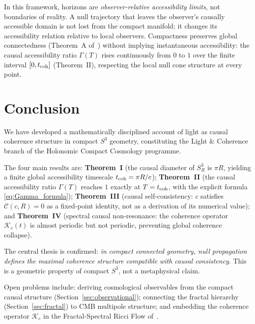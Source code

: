 \documentclass[12pt,a4paper]{article}
\theoremstyle{plain}
\theoremstyle{definition}
\theoremstyle{remark}
\begin{document}
In this framework, horizons are \emph{observer-relative accessibility limits},
not boundaries of reality.
A null trajectory that leaves the observer's causally accessible domain is not
lost from the compact manifold; it changes its accessibility relation relative
to local observers.
Compactness preserves global connectedness (Theorem~A of~\cite{HCC25}) without
implying instantaneous accessibility: the causal accessibility ratio $\Gamma(T)$
rises continuously from $0$ to $1$ over the finite interval $[0, t_{\rm coh}]$
(Theorem~II), respecting the local null cone structure at every point.

\section*{Conclusion}

We have developed a mathematically disciplined account of light as causal
coherence structure in compact $S^3$ geometry, constituting the Light \& Coherence
branch of the Holonomic Compact Cosmology programme.

The four main results are:
\textbf{Theorem~I} (the causal diameter of $S^3_R$ is $\pi R$, yielding a finite
global accessibility timescale $t_{\rm coh} = \pi R/c$);
\textbf{Theorem~II} (the causal accessibility ratio $\Gamma(T)$ reaches $1$
exactly at $T = t_{\rm coh}$, with the explicit formula \eqref{eq:Gamma_formula});
\textbf{Theorem~III} (causal self-consistency: $c$ satisfies $\mathcal{C}(c,R)=0$
as a fixed-point identity, not as a derivation of its numerical value);
and \textbf{Theorem~IV} (spectral causal non-resonance: the coherence operator
$\mathcal{K}_c(t)$ is almost periodic but not periodic, preventing global
coherence collapse).

The central thesis is confirmed: \emph{in compact connected geometry, null
propagation defines the maximal coherence structure compatible with causal
consistency}.
This is a geometric property of compact $S^3$, not a metaphysical claim.

Open problems include: deriving cosmological observables from the compact causal
structure (Section~\ref{sec:observational}); connecting the fractal hierarchy
(Section~\ref{sec:fractal}) to CMB multipole structure;
and embedding the coherence operator $\mathcal{K}_c$ in the Fractal-Spectral Ricci
Flow of~\cite{PB25a}.
\end{document}
